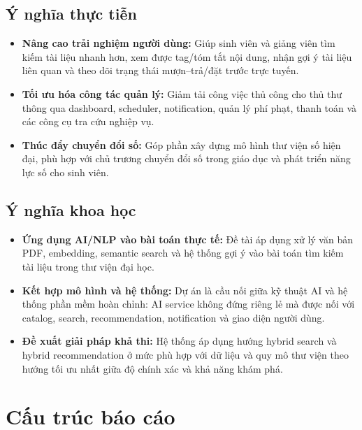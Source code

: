 \subsection{Ý nghĩa thực tiễn}
\label{subsec:YNghiaThucTien}
\begin{itemize}
    \item \textbf{Nâng cao trải nghiệm người dùng:} Giúp sinh viên và giảng viên
    tìm kiếm tài liệu nhanh hơn, xem được tag/tóm tắt nội dung, nhận gợi ý tài
    liệu liên quan và theo dõi trạng thái mượn--trả/đặt trước trực tuyến.
    \item \textbf{Tối ưu hóa công tác quản lý:} Giảm tải công việc thủ công cho
    thủ thư thông qua dashboard, scheduler, notification, quản lý phí phạt,
    thanh toán và các công cụ tra cứu nghiệp vụ.
    \item \textbf{Thúc đẩy chuyển đổi số:} Góp phần xây dựng mô hình thư viện số
    hiện đại, phù hợp với chủ trương chuyển đổi số trong giáo dục và phát triển
    năng lực số cho sinh viên.
\end{itemize}

\subsection{Ý nghĩa khoa học}
\label{subsec:YNghiaKhoaHoc}
\begin{itemize}
    \item \textbf{Ứng dụng AI/NLP vào bài toán thực tế:} Đề tài áp dụng xử lý
    văn bản PDF, embedding, semantic search và hệ thống gợi ý vào bài toán tìm
    kiếm tài liệu trong thư viện đại học.
    \item \textbf{Kết hợp mô hình và hệ thống:} Dự án là cầu nối giữa kỹ thuật
    AI và hệ thống phần mềm hoàn chỉnh: AI service không đứng riêng lẻ mà được
    nối với catalog, search, recommendation, notification và giao diện người
    dùng.
    \item \textbf{Đề xuất giải pháp khả thi:} Hệ thống áp dụng hướng hybrid
    search và hybrid recommendation ở mức phù hợp với dữ liệu và quy mô thư viện theo hướng tối ưu nhất giữa độ chính xác và khả năng khám phá.
\end{itemize}

\section{Cấu trúc báo cáo}
\label{sec:CauTruc}

